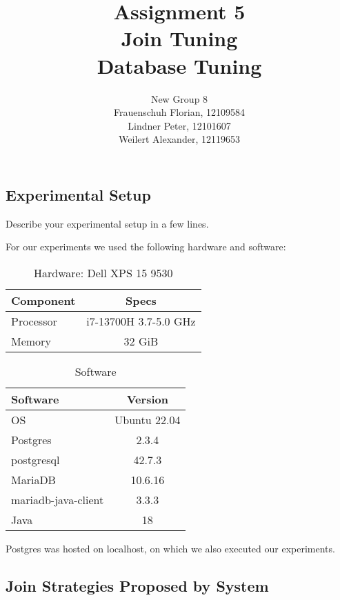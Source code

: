 \documentclass[11pt]{scrartcl}
\title{
  \textbf{\large Assignment 5} \\
  Join Tuning \\
  {\large Database Tuning}}
\author{
  New Group 8 \\
  \large Frauenschuh Florian, 12109584 \\
  \large Lindner Peter, 12101607 \\
  \large Weilert Alexander, 12119653
}
\begin{document}
\maketitle

\subsection*{Experimental Setup}

Describe your experimental setup in a few lines.

For our experiments we used the following hardware and software:

\begin{multicols}{2}
  \begin{table}[H]
    \centering
    \begin{tabular}{lc}
      \toprule
      Component & Specs \\
      \midrule
      Processor & i7-13700H 3.7-5.0 GHz \\
      Memory & 32 GiB \\
      \bottomrule
    \end{tabular}
    \caption{Hardware: Dell XPS 15 9530}
    \label{table:hardware}
  \end{table}

  \columnbreak

  \begin{table}[H]
    \centering
    \begin{tabular}{lc}
      \toprule
      Software & Version \\
      \midrule
      OS & Ubuntu 22.04 \\
      Postgres & 2.3.4 \\
      postgresql & 42.7.3 \\
      MariaDB & 10.6.16 \\
      mariadb-java-client & 3.3.3 \\
      Java & 18 \\
      \bottomrule
    \end{tabular}
    \caption{Software}
    \label{table:software_versions}
  \end{table}
\end{multicols}

Postgres was hosted on localhost, on which we also executed our experiments.

\subsection*{Join Strategies Proposed by System}
\end{document}
